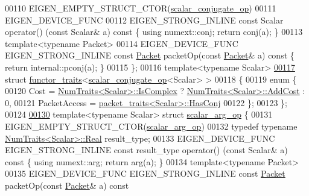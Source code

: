 \begin{DoxyCode}
00110   EIGEN\_EMPTY\_STRUCT\_CTOR(\hyperlink{struct_eigen_1_1internal_1_1scalar__conjugate__op}{scalar\_conjugate\_op})
00111   EIGEN\_DEVICE\_FUNC
00112   EIGEN\_STRONG\_INLINE \textcolor{keyword}{const} Scalar operator() (\textcolor{keyword}{const} Scalar& a)\textcolor{keyword}{ const }\{ \textcolor{keyword}{using} numext::conj; \textcolor{keywordflow}{return} conj(a);
       \}
00113   \textcolor{keyword}{template}<\textcolor{keyword}{typename} Packet>
00114   EIGEN\_DEVICE\_FUNC EIGEN\_STRONG\_INLINE \textcolor{keyword}{const} \hyperlink{union_eigen_1_1internal_1_1_packet}{Packet} packetOp(\textcolor{keyword}{const} \hyperlink{union_eigen_1_1internal_1_1_packet}{Packet}& a)\textcolor{keyword}{ const }\{ \textcolor{keywordflow}{return} 
      internal::pconj(a); \}
00115 \};
00116 \textcolor{keyword}{template}<\textcolor{keyword}{typename} Scalar>
\hyperlink{struct_eigen_1_1internal_1_1functor__traits_3_01scalar__conjugate__op_3_01_scalar_01_4_01_4}{00117} \textcolor{keyword}{struct }\hyperlink{struct_eigen_1_1internal_1_1functor__traits}{functor\_traits}<\hyperlink{struct_eigen_1_1internal_1_1scalar__conjugate__op}{scalar\_conjugate\_op}<Scalar> >
00118 \{
00119   \textcolor{keyword}{enum} \{
00120     Cost = \hyperlink{group___core___module_struct_eigen_1_1_num_traits}{NumTraits<Scalar>::IsComplex} ? 
      \hyperlink{group___core___module_struct_eigen_1_1_num_traits}{NumTraits<Scalar>::AddCost} : 0,
00121     PacketAccess = \hyperlink{struct_eigen_1_1internal_1_1packet__traits}{packet\_traits<Scalar>::HasConj}
00122   \};
00123 \};
00124 
\hyperlink{struct_eigen_1_1internal_1_1scalar__arg__op}{00130} \textcolor{keyword}{template}<\textcolor{keyword}{typename} Scalar> \textcolor{keyword}{struct }\hyperlink{struct_eigen_1_1internal_1_1scalar__arg__op}{scalar\_arg\_op} \{
00131   EIGEN\_EMPTY\_STRUCT\_CTOR(\hyperlink{struct_eigen_1_1internal_1_1scalar__arg__op}{scalar\_arg\_op})
00132   \textcolor{keyword}{typedef} \textcolor{keyword}{typename} \hyperlink{group___core___module_struct_eigen_1_1_num_traits}{NumTraits<Scalar>::Real} result\_type;
00133   EIGEN\_DEVICE\_FUNC EIGEN\_STRONG\_INLINE \textcolor{keyword}{const} result\_type operator() (\textcolor{keyword}{const} Scalar& a)\textcolor{keyword}{ const }\{ \textcolor{keyword}{using} 
      numext::arg; \textcolor{keywordflow}{return} arg(a); \}
00134   \textcolor{keyword}{template}<\textcolor{keyword}{typename} Packet>
00135   EIGEN\_DEVICE\_FUNC EIGEN\_STRONG\_INLINE \textcolor{keyword}{const} \hyperlink{union_eigen_1_1internal_1_1_packet}{Packet} packetOp(\textcolor{keyword}{const} \hyperlink{union_eigen_1_1internal_1_1_packet}{Packet}& a)\textcolor{keyword}{ const}

\end{DoxyCode}
